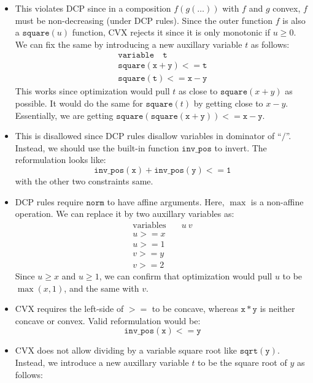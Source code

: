 \documentclass{article}
\begin{document}
\begin{itemize}
\begin{itemize}
    \begin{align*}
      \mathtt{x + 2*y == 0} \\
      \mathtt{x - y == 0}
    \end{align*}
    \item[2.] This violates DCP since in a composition $f(g(\ldots))$ with $f$ and $g$ convex, $f$ must be non-decreasing (under DCP rules). Since the outer function $f$ is also a $\mathtt{square}(u)$ function, CVX rejects it since it is only monotonic if $u \ge 0$. \\
    We can fix the same by introducing a new auxillary variable $t$ as follows: 
    \begin{align*}
      \mathtt{variable \quad t} \\
      \mathtt{square(x + y) <= t} \\
      \mathtt{square(t) <= x - y}
    \end{align*}
    This works since optimization would pull $t$ as close to $\mathtt{square}(x+y)$ as possible. It would do the same for $\mathtt{square}(t)$ by getting close to $x - y$. Essentially, we are getting $\mathtt{square(square(x + y)) <= x - y}$.
    \item[3.] This is disallowed since DCP rules disallow variables in dominator of ``$\mathtt{/}$''. Instead, we should use the built-in function $\mathtt{inv\_pos}$ to invert. The reformulation looks like:
    \[ \mathtt{inv\_pos(x) + inv\_pos(y) <= 1} \]
    with the other two constraints same.
    \item[4.] DCP rules require $\mathtt{norm}$ to have affine arguments. Here, $\max$ is a non-affine operation. We can replace it by two auxillary variables as:
    \begin{align*}
      \text{variables} \quad & u ~ v \\
      u >= x \\
      u >= 1 \\
      v >= y \\
      v >= 2
    \end{align*}
    Since $u \ge x$ and $u \ge 1$, we can confirm that optimization would pull $u$ to be $\max(x, 1)$, and the same with $v$.
    \item[5.] CVX requires the left-side of $\mathtt{>=}$ to be concave, whereas $\mathtt{x*y}$ is neither concave or convex. Valid reformulation would be:
    \[ \mathtt{inv\_pos(x) <= y} \]
    \item[6.] CVX does not allow dividing by a variable square root like $\mathtt{sqrt(y)}$. Instead, we introduce a new auxillary variable $t$ to be the square root of $y$ as follows:

\end{itemize}
\end{itemize}
\end{document}
